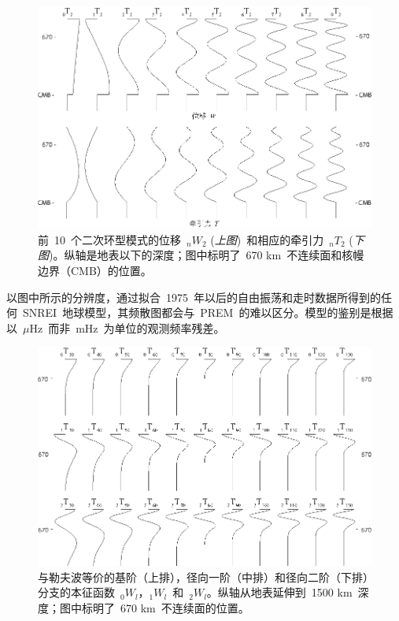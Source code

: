 \begin{figure}[!b]
\begin{center}
\includegraphics{../figures/chap08/fig06.eps}
\end{center}
\caption[deg2modes]{\label{fig:deg2modes}
前~10~个二次环型模式的位移~${}_nW_2$ ({\em 上图\/})~和相应的牵引力~${}_nT_2$ ({\em 下图\/})。纵轴是地表以下的深度；图中标明了~670 km~不连续面和核幔边界（CMB）的位置。
}
\end{figure}
以图中所示的分辨度，通过拟合~1975~年以后的自由振荡和走时数据所得到的任何~SNREI~地球模型，其频散图都会与~PREM~的难以区分。模型的鉴别是根据以~$\mu$Hz~而非~mHz~为单位的观测频率残差。

\begin{figure}[!t]
\begin{center}
\includegraphics{../figures/chap08/fig07.eps}
\end{center}
\caption[Lovemodes2]{\label{fig:Lovemodes2}
与勒夫波等价的基阶（上排），径向一阶（中排）和径向二阶（下排）分支的本征函数~${}_0W_l$，${}_1W_l$~和~${}_2W_l$。纵轴从地表延伸到~1500 km~深度；图中标明了~670 km~不连续面的位置。
}
\end{figure}

